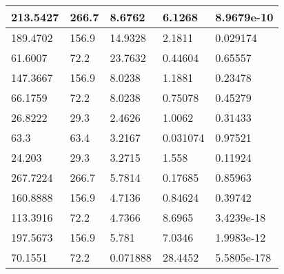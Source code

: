 \begin{tabular}{|l|l|l|l|l|}
\hline
213.5427&266.7&8.6762&6.1268&8.9679e-10\\\hline
189.4702&156.9&14.9328&2.1811&0.029174\\\hline
61.6007&72.2&23.7632&0.44604&0.65557\\\hline
147.3667&156.9&8.0238&1.1881&0.23478\\\hline
66.1759&72.2&8.0238&0.75078&0.45279\\\hline
26.8222&29.3&2.4626&1.0062&0.31433\\\hline
63.3&63.4&3.2167&0.031074&0.97521\\\hline
24.203&29.3&3.2715&1.558&0.11924\\\hline
267.7224&266.7&5.7814&0.17685&0.85963\\\hline
160.8888&156.9&4.7136&0.84624&0.39742\\\hline
113.3916&72.2&4.7366&8.6965&3.4239e-18\\\hline
197.5673&156.9&5.781&7.0346&1.9983e-12\\\hline
70.1551&72.2&0.071888&28.4452&5.5805e-178\\\hline
\end{tabular}
